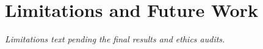 \documentclass[manuscript,review,anonymous]{acmart}
\begin{document}
\section{Limitations and Future Work}
\textit{Limitations text pending the final results and ethics audits.}

% 
% 
\end{document}
